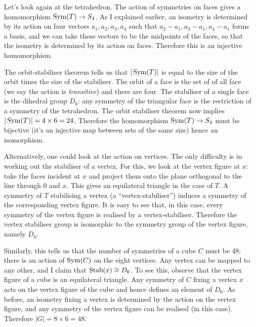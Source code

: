\documentclass[12pt]{article}
\begin{document}
\begin{exm}
  Let's look again at the tetrahedron. The action of symmetries on faces gives a homomorphism $\operatorname{Sym}(T)\to S_4$. As I explained earlier, an isometry is determined by its action on four vectors $a_1,a_2,a_3,a_4$ such that $a_2-a_1,a_3-a_1,a_4-a_1$ forms a basis, and we can take these vectors to be the midpoints of the faces, so that the isometry is determined by its action on faces. Therefore this is an injective homomorphism.

  The orbit-stabiliser theorem tells us that $|\operatorname{Sym}(T)|$ is equal to the size of the orbit times the size of the stabiliser. The orbit of a face is the set of of all face (we say the action is {\em transitive}) and there are four. The stabiliser of a single face is the dihedral group $D_6$: any symmetry of the triangular face is the restriction of a symmetry of the tetrahedron. The orbit stabiliser theorem now implies $|\operatorname{Sym}(T)|=4\times 6=24$. Therefore the homomorphism $\operatorname{Sym}(T)\to S_4$ must be bijective (it's an injective map between sets of the same size) hence an isomorphism.
\end{exm}

\begin{exm}
Alternatively, one could look at the action on vertices. The only difficulty is in working out the stabiliser of a vertex. For this, we look at the vertex figure at $x$: take the faces incident at $x$ and project them onto the plane orthogonal to the line through $0$ and $x$. This gives an equilateral triangle in the case of $T$. A symmetry of $T$ stabilising a vertex (a ``vertex-stabiliser'') induces a symmetry of the corresponding vertex figure. It is easy to see that, in this case, every symmetry of the vertex figure is realised by a vertex-stabiliser. Therefore the vertex stabiliser group is isomorphic to the symmetry group of the vertex figure, namely $D_6$.
\end{exm}

\begin{exm}
Similarly, this tells us that the number of symmetries of a cube $C$ must be 48: there is an action of $\operatorname{Sym}(C)$ on the eight vertices. Any vertex can be mapped to any other, and I claim that $\operatorname{Stab}(x)\cong D_6$. To see this, observe that the vertex figure of a cube is an equilateral triangle. Any symmetry of $C$ fixing a vertex $x$ acts on the vertex figure of the cube and hence defines an element of $D_6$. As before, an isometry fixing a vertex is determined by the action on the vertex figure, and any symmetry of the vertex figure can be realised (in this case). Therefore $|G|=8\times 6=48$.
\end{exm}
\end{document}
